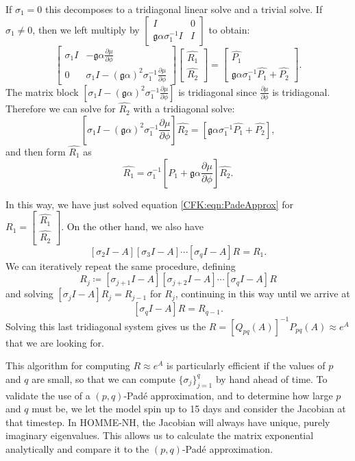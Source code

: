 \documentclass{csri19}
\newcommand{\CFKg}{\mathfrak{g}}
\begin{document}
If $\sigma_1 = 0$ this decomposes to a tridiagonal linear solve and a 
trivial solve. If $\sigma_1 \neq 0$, then we left multiply by 
$\begin{bmatrix} I & 0 \\ \CFKg\alpha \sigma_1^{-1}I & I \end{bmatrix}$ 
to obtain:
\[\begin{bmatrix} 
 \sigma_1 I  & -\CFKg\alpha \frac{\partial\mu}{\partial\phi} \\
         0 & \sigma_1 I -\left(\CFKg\alpha\right)^2  \sigma_1^{-1}\frac{\partial\mu}{\partial\phi}
 \end{bmatrix}
 \begin{bmatrix} \hat{R_1} \\
 \hat{R_2} \end{bmatrix} = 
\begin{bmatrix} \hat{P_1} \\
 \CFKg\alpha \sigma_1^{-1} \hat{P_1} +  \hat{P_2} \end{bmatrix}.\]
The matrix block $\left[\sigma_1 I -\left(\CFKg\alpha\right)^2\sigma_1^{-1}\frac{\partial\mu}{\partial\phi}\right]$ 
is tridiagonal since $\frac{\partial\mu}{\partial\phi}$ is tridiagonal. 
Therefore we can solve for $\hat{R_2}$ with a tridiagonal 
solve:
\[\left[\sigma_1 I -\left(\CFKg\alpha \right)^2  \sigma_1^{-1}\frac{\partial\mu}{\partial\phi}\right]\hat{R_2}
 = \left[\CFKg\alpha\sigma_1^{-1} \hat{P_1} +  \hat{P_2}\right],\]
and then form $\hat{R_1}$ as 
\[\hat{R_1} = \sigma_1^{-1}\left[P_1 + \CFKg\alpha\frac{\partial \mu}{\partial \phi}\right] \hat{R_2}.\]

In this way, we have just solved equation \ref{CFK:eqn:PadeApprox} for $R_1 = \begin{bmatrix} \hat{R_1}\\ \hat{R_2}\end{bmatrix}$. 
On the other hand, we also have
\[\left[\sigma_2I-A\right]\left[\sigma_3I-A\right]\cdots\left[\sigma_qI-A\right]R = R_1.\] 
We can iteratively repeat the same procedure, defining 
\[R_j \coloneqq \left[\sigma_{j+1}I-A\right]\left[\sigma_{j+2}I-A\right]\cdots\left[\sigma_qI-A\right]R\]
 and solving $\left[\sigma_jI-A\right]R_j = R_{j-1}$ for $R_j$, continuing 
in this way until we arrive at \[\left[\sigma_qI-A\right]R = R_{q-1}.\] 
Solving this last tridiagonal system gives us the $R = \left[Q_{pq}(A)\right]^{-1}P_{pq}(A)\approx e^A$
 that we are looking for.

This algorithm for computing $R \approx e^A$ is particularly efficient if 
the values of $p$ and $q$ are small, so that we can compute $\{\sigma_j\}_
{j=1}^q$ by hand ahead of time. To validate the use of a $(p,q)$-Pad\'e 
approximation, and to determine how large $p$ and $q$ must be, we let the 
model spin up to 15 days and consider the Jacobian at that timestep. In 
HOMME-NH, the Jacobian will always have unique, purely imaginary 
eigenvalues. This allows us to calculate the matrix exponential 
analytically and compare it to the $(p,q)$-Pad\'e approximation.
\end{document}
